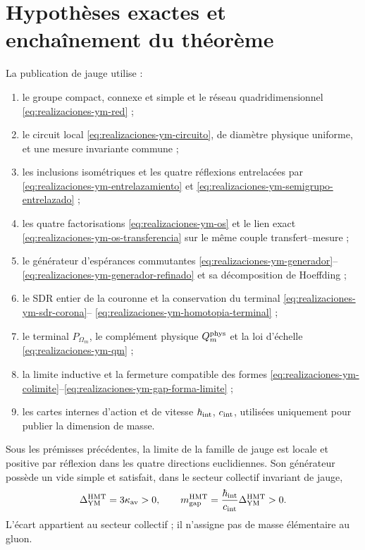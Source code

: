 \section*{Hypothèses exactes et enchaînement du théorème}

La publication de jauge utilise :
\begin{enumerate}
 \item le groupe compact, connexe et simple et le réseau quadridimensionnel
       \eqref{eq:realizaciones-ym-red} ;
 \item le circuit local \eqref{eq:realizaciones-ym-circuito}, de diamètre physique uniforme, et une mesure invariante commune ;
 \item les inclusions isométriques et les quatre réflexions entrelacées par
       \eqref{eq:realizaciones-ym-entrelazamiento} et
       \eqref{eq:realizaciones-ym-semigrupo-entrelazado} ;
 \item les quatre factorisations
       \eqref{eq:realizaciones-ym-os} et le lien exact
       \eqref{eq:realizaciones-ym-os-transferencia} sur le même couple
       transfert--mesure ;
 \item le générateur d'espérances commutantes \eqref{eq:realizaciones-ym-generador}--\eqref{eq:realizaciones-ym-generador-refinado} et sa décomposition de Hoeffding ;
 \item le SDR entier de la couronne et la conservation du terminal
       \eqref{eq:realizaciones-ym-sdr-corona}--
       \eqref{eq:realizaciones-ym-homotopia-terminal} ;
 \item le terminal \(P_{\Omega_m}\), le complément physique
       \(Q_m^{\rm phys}\) et la loi d’échelle
       \eqref{eq:realizaciones-ym-qm} ;
 \item la limite inductive et la fermeture compatible des formes \eqref{eq:realizaciones-ym-colimite}--\eqref{eq:realizaciones-ym-gap-forma-limite} ;
 \item les cartes internes d’action et de vitesse
       \(\hbar_{\rm int}\), \(c_{\rm int}\), utilisées uniquement pour publier la
       dimension de masse.
\end{enumerate}

\begin{theorem}
\label{thm:realizaciones-ym}
Sous les prémisses précédentes, la limite de la famille de jauge est locale et positive par réflexion dans les quatre directions euclidiennes. Son générateur possède un vide simple et satisfait, dans le secteur collectif invariant de jauge,
\begin{equation}\label{eq:realizaciones-ym-gap-limite}
 \Delta_{\rm YM}^{\rm HMT}=3\kappa_{\rm av}>0,
 \qquad
 m_{\rm gap}^{\rm HMT}
 =\frac{\hbar_{\rm int}}{c_{\rm int}}
  \Delta_{\rm YM}^{\rm HMT}>0.
\end{equation}
L’écart appartient au secteur collectif ; il n’assigne pas de masse élémentaire au
gluon.
\end{theorem}


